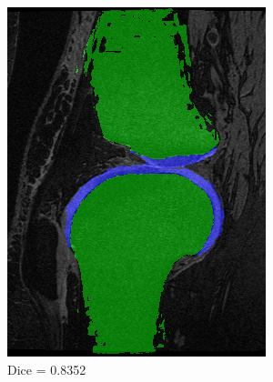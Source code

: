 \documentclass[a4paper,12pt]{article}
\begin{document}
\begin{figure}[H]
\begin{subfigure}[b]{0.32\linewidth}
    \includegraphics[width=\linewidth]{final_SPBM_median.png}
    \caption{Dice = 0.8352}
    \end{subfigure}
    \begin{subfigure}[b]{0.32\linewidth}

\end{subfigure}
\end{figure}
\end{document}
